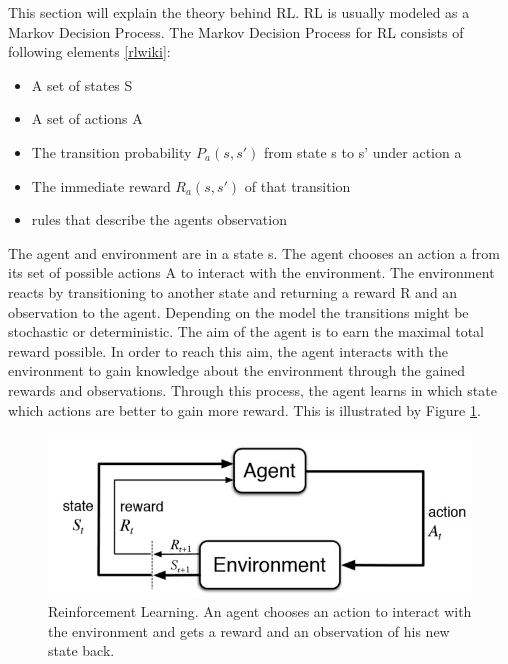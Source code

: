 \vspace{0.5cm}

This section will explain the theory behind RL. RL is usually modeled as a Markov Decision Process. The Markov Decision Process for RL consists of following elements \ref{rlwiki}:

\begin{itemize}
	\item A set of states S
	\item A set of actions A
	\item The transition probability $P_a(s,s')$ from state s to s' under action a
	\item The immediate reward $R_a(s,s')$ of that transition
	\item rules that describe the agents observation
\end{itemize}

The agent and environment are in a state s. The agent chooses an action a from its set of possible actions A to interact with the environment. The environment reacts by transitioning to another state and returning a reward R and an observation to the agent. Depending on the model the transitions might be stochastic or deterministic. The aim of the agent is to earn the maximal total reward possible. In order to reach this aim, the agent interacts with the environment to gain knowledge about the environment through the gained rewards and observations. Through this process, the agent learns in which state which actions are better to gain more reward. This is illustrated by Figure \ref{rl_general}.

\begin{figure} [h]
	
	\centering
	\includegraphics[width=1\textwidth]{figures/rl_general.jpg}
	\caption{Reinforcement Learning. An agent chooses an action to interact with the environment and gets a reward and an observation of his new state back. 
		\label{rl_general}	
		\cite{rl_general.jpg}
	}
\end{figure}


